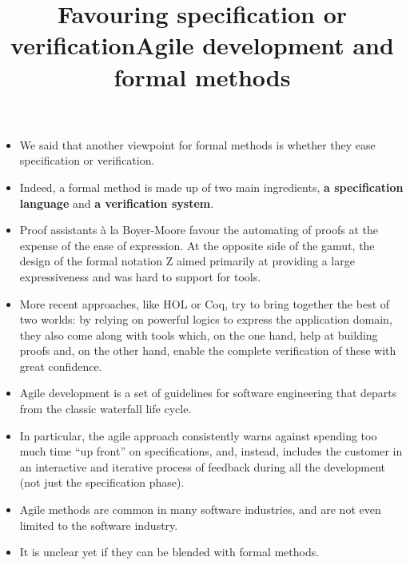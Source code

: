 \documentclass[wide]{slides}
\begin{document}
\begin{slide}
  \title{Favouring specification or verification}

  \begin{itemize}

    \item We said that another viewpoint for formal methods is whether
      they ease specification or verification.

    \item Indeed, a formal method is made up of two main ingredients,
      \textbf{a specification language} and \textbf{a verification
        system}.

    \item Proof assistants \`a la Boyer-Moore favour the automating of
      proofs at the expense of the ease of expression. At the opposite
      side of the gamut, the design of the formal notation \textsf{Z}
      aimed primarily at providing a large expressiveness and was hard
      to support for tools.

    \item More recent approaches, like \textsf{HOL} or \textsf{Coq},
      try to bring together the best of two worlds: by relying on
      powerful logics to express the application domain, they also
      come along with tools which, on the one hand, help at building
      proofs and, on the other hand, enable the complete verification
      of these with great confidence.

  \end{itemize}

\end{slide}

\begin{slide}
  \title{Agile development and formal methods}

  \begin{itemize}

    \item Agile development is a set of guidelines for software
      engineering that departs from the classic waterfall life cycle.

    \item In particular, the agile approach consistently warns against
      spending too much time ``up front'' on specifications, and,
      instead, includes the customer in an interactive and iterative
      process of feedback during all the development (not just the
      specification phase).

    \item Agile methods are common in many software industries, and
      are not even limited to the software industry.

    \item It is unclear yet if they can be blended with formal
      methods.

  \end{itemize}

\end{slide}
\end{document}
